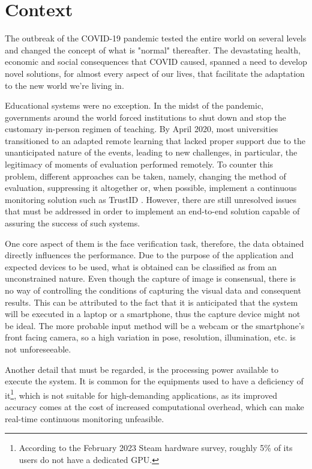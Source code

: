 \documentclass[class=report, crop=false, a4paper, 12pt]{standalone}
\begin{document}
\section{Context}
The outbreak of the COVID-19 pandemic tested the entire world on several levels and changed the concept of what is "normal" thereafter. The devastating health, economic and social consequences that COVID caused, spanned a need to develop novel solutions, for almost every aspect of our lives, that facilitate the adaptation to the new world we're living in. 

\par Educational systems were no exception. In the midst of the pandemic, governments around the world forced institutions to shut down and stop the customary in-person regimen of teaching. By April 2020, most universities transitioned to an adapted remote learning \autocite{winsteadRemoteMicroelectronicsLaboratory2022} that lacked proper support due to the unanticipated nature of the events, leading to new challenges, in particular, the legitimacy of moments of evaluation performed remotely. To counter this problem, different approaches can be taken, namely, changing the method of evaluation, suppressing it altogether \autocite{barronrodriguezRemoteLearningGlobal2021} or, when possible, implement a continuous monitoring solution such as TrustID . However, there are still unresolved issues that must be addressed in order to implement an end-to-end solution capable of assuring the success of such systems. 

\par One core aspect of them is the face verification task, therefore, the data obtained directly influences the performance. Due to the purpose of the application and expected devices to be used, what is obtained can be classified as from an unconstrained nature. Even though the capture of image is consensual, there is no way of controlling the conditions of capturing the visual data and consequent results. This can be attributed to the fact that it is anticipated that the system will be executed in a laptop or a smartphone, thus the capture device might not be ideal. The more probable input method will be a webcam or the smartphone's front facing camera, so a high variation in pose, resolution, illumination, etc. is not unforeseeable. 

\par Another detail that must be regarded, is the processing power available to execute the system. It is common for the equipments used to have a deficiency of it\footnote{According to the February 2023 Steam hardware survey, roughly 5\% of its users do not have a dedicated GPU.}, which is not suitable for high-demanding applications, as its improved accuracy comes at the cost of increased computational overhead, which can make real-time continuous monitoring unfeasible.
\end{document}
